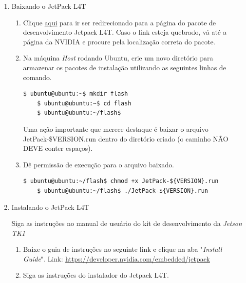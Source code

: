 \begin{enumerate}
  \item Baixando o JetPack L4T
    \begin{enumerate}
      \item Clique \href{http://docs.nvidia.com/jetpack-l4t/index.html#developertools/mobile/jetpack/jetpack_l4t/2.1/jetpack_l4t_install.htm}{aqui} para ir ser redirecionado para a página do pacote de desenvolvimento Jetpack L4T. Caso o link esteja quebrado, vá até a página da NVIDIA e procure pela localização correta do pacote.  

      \item Na máquina \textit{Host} rodando Ubuntu, crie um novo diretório para armazenar os pacotes de instalação utilizando as seguintes linhas de comando.

      \begin{lstlisting}[basicstyle=\tiny]
	$ ubuntu@ubuntu:~$ mkdir flash
	$ ubuntu@ubuntu:~$ cd flash
	$ ubuntu@ubuntu:~/flash$ 
      \end{lstlisting}

      Uma ação importante que merece destaque é baixar o arquivo JetPack-\${VERSION}.run dentro do diretório criado (o caminho NÃO DEVE conter espaços).

      \item Dê permissão de execução para o arquivo baixado. 
      \begin{lstlisting}[basicstyle=\tiny]
	$ ubuntu@ubuntu:~/flash$ chmod +x JetPack-${VERSION}.run
	$ ubuntu@ubuntu:~/flash$ ./JetPack-${VERSION}.run
      \end{lstlisting}


    \end{enumerate}
  \item Instalando o JetPack L4T

    Siga as instruções no manual de usuário do kit de desenvolvimento da \textit{Jetson TK1}
    \begin{enumerate}
      \item Baixe o guia de instruções no seguinte link e clique na aba "\textit{Install Guide}". Link: \url{https://developer.nvidia.com/embedded/jetpack}
      \item Siga as instruções do instalador do Jetpack L4T.


\end{enumerate}
\end{enumerate}

